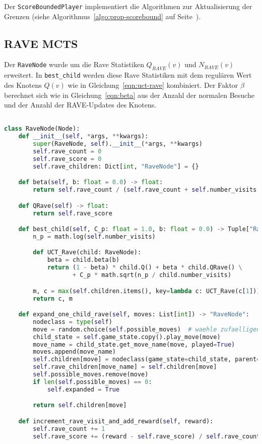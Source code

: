 Der \verb|ScoreBoundedPlayer| implementiert die Algorithmen zur Aktualisierung der Grenzen (siehe Algorithmus~\ref{algo:prop-scorebound} auf Seite~\pageref{algo:prop-scorebound}).


\subsection{RAVE MCTS}

Der \verb|RaveNode| wurde um die Rave Statistiken $Q_{RAVE}(v)$ und $N_{RAVE}(v)$ erweitert.
In \verb|best_child| werden diese Rave Statistiken mit dem regulären Wert des Knotens $Q(v)$ wie in Gleichung~\ref{eqn:uct-rave} kombiniert.
Der Faktor $\beta$ berechnet sich wie in Gleichung~\ref{eqn:beta} aus der Anzahl der normalen Besuche und der Anzahl der RAVE-Updates des Knotens.

\begin{lstlisting}[language=Python,label={lst:rave-node}]

class RaveNode(Node):
    def __init__(self, *args, **kwargs):
        super(RaveNode, self).__init__(*args, **kwargs)
        self.rave_count = 0
        self.rave_score = 0
        self.rave_children: Dict[int, "RaveNode"] = {}

    def beta(self, b: float = 0.0) -> float:
        return self.rave_count / (self.rave_count + self.number_visits + self.rave_count * self.number_visits * b * b)

    def QRave(self) -> float:
        return self.rave_score

    def best_child(self, C_p: float = 1.0, b: float = 0.0) -> Tuple["RaveNode", int]:
        n_p = math.log(self.number_visits)

        def UCT_Rave(child: RaveNode):
            beta = child.beta(b)
            return (1 - beta) * child.Q() + beta * child.QRave() \
                   + C_p * math.sqrt(n_p / child.number_visits)

        m, c = max(self.children.items(), key=lambda c: UCT_Rave(c[1]))
        return c, m

    def expand_one_child_rave(self, moves: List[int]) -> "RaveNode":
        nodeclass = type(self)
        move = random.choice(self.possible_moves)  # waehle zufaelligen Zug
        child_state = self.game_state.copy().play_move(move)
        move_name = child_state.get_move_name(move, played=True)
        moves.append(move_name)
        self.children[move] = nodeclass(game_state=child_state, parent=self)
        self.rave_children[move_name] = self.children[move]
        self.possible_moves.remove(move)
        if len(self.possible_moves) == 0:
            self.expanded = True

        return self.children[move]

    def increment_rave_visit_and_add_reward(self, reward):
        self.rave_count += 1
        self.rave_score += (reward - self.rave_score) / self.rave_count
\end{lstlisting}


